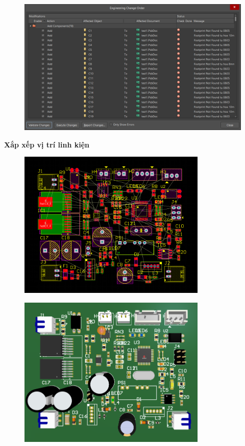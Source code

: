 \begin{figure}[H]
    \centering
    \includegraphics[width=1\textwidth]{pictures/7c.png}
\end{figure}
\cleardoublepage
\textbf{Xắp xếp vị trí linh kiện}
\begin{figure}[H]
    \centering
    \includegraphics[width=0.8\textwidth]{pictures/7d.png}
\end{figure}
\begin{figure}[H]
    \centering
    \includegraphics[width=0.8\textwidth]{pictures/7e.png}
\end{figure}
